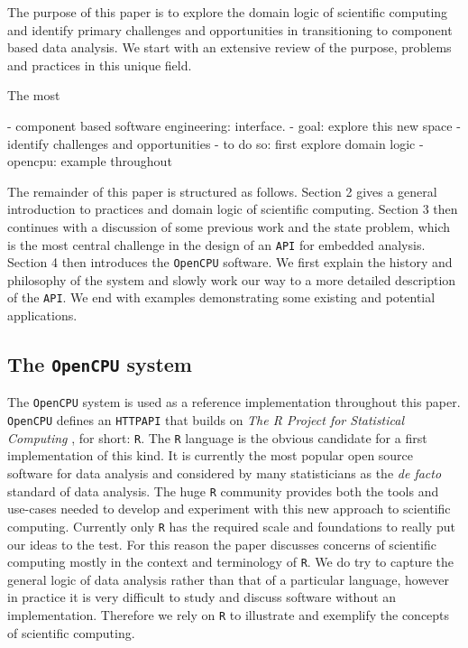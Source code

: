 \documentclass{article}
\newcommand{\R}{\texttt{R}\xspace}
\newcommand{\HTTP}{\texttt{HTTP}\xspace}
\newcommand{\API}{\texttt{API}\xspace}
\newcommand{\OpenCPU}{\texttt{OpenCPU}\xspace}
\begin{document}
The purpose of this paper is to explore the domain logic of scientific computing and identify primary challenges and opportunities in transitioning to component based data analysis. We start with an extensive review of the purpose, problems and practices in this unique field. 


The most 


- component based software engineering: interface.
- goal: explore this new space
- identify challenges and opportunities
- to do so: first explore domain logic
- opencpu: example throughout

The remainder of this paper is structured as follows. Section 2 gives a general introduction to practices and domain logic of scientific computing. Section 3 then continues with a discussion of some previous work and the state problem, which is the most central challenge in the design of an \API for embedded analysis. Section 4 then introduces the \OpenCPU software. We first explain the history and philosophy of the system and slowly work our way to a more detailed description of the \API. We end with  examples demonstrating some existing and potential applications.





\subsection{The \OpenCPU system}

The \OpenCPU system is used as a reference implementation throughout this paper. \OpenCPU defines an \HTTP \API that builds on \emph{The R Project for Statistical Computing} \citep{R}, for short: \R. The \R language is the obvious candidate for a first implementation of this kind. It is currently the most popular open source software for data analysis and considered by many statisticians as the \emph{de facto} standard of data analysis. The huge \R community provides both the tools and use-cases needed to develop and experiment with this new approach to scientific computing. Currently only \R has the required scale and foundations to really put our ideas to the test. For this reason the paper discusses concerns of scientific computing mostly in the context and terminology of \R. We do try to capture the general logic of data analysis rather than that of a particular language, however in practice it is very difficult to study and discuss software without an implementation. Therefore we rely on \R to illustrate and exemplify the concepts of scientific computing. 
\end{document}
